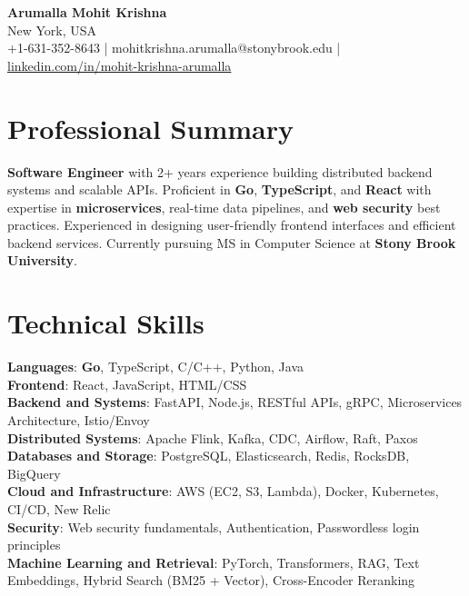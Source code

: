 \documentclass[letterpaper,11pt]{article}
\begin{document}
\begin{center}
  {\Large \textbf{Arumalla Mohit Krishna}} \\
  New York, USA \\
  +1-631-352-8643 \enspace | \enspace mohitkrishna.arumalla@stonybrook.edu \enspace | \enspace \href{https://www.linkedin.com/in/mohit-krishna-arumalla}{linkedin.com/in/mohit-krishna-arumalla}
\end{center}

\section{Professional Summary}
  \begin{itemize}[leftmargin=0.15in, label={}]
    \small{\item{
     \textbf{Software Engineer} with 2+ years experience building distributed backend systems and scalable APIs. Proficient in \textbf{Go}, \textbf{TypeScript}, and \textbf{React} with expertise in \textbf{microservices}, real-time data pipelines, and \textbf{web security} best practices. Experienced in designing user-friendly frontend interfaces and efficient backend services. Currently pursuing MS in Computer Science at \textbf{Stony Brook University}.
    }}
  \end{itemize}
\vspace{-16pt}

\section{Technical Skills}
 \begin{itemize}[leftmargin=0.15in, label={}]
    \small{\item{
     \textbf{Languages}: \textbf{Go}, TypeScript, C/C++, Python, Java \\
     \textbf{Frontend}: React, JavaScript, HTML/CSS \\
     \textbf{Backend and Systems}: FastAPI, Node.js, RESTful APIs, gRPC, Microservices Architecture, Istio/Envoy \\
     \textbf{Distributed Systems}: Apache Flink, Kafka, CDC, Airflow, Raft, Paxos \\
     \textbf{Databases and Storage}: PostgreSQL, Elasticsearch, Redis, RocksDB, BigQuery \\
     \textbf{Cloud and Infrastructure}: AWS (EC2, S3, Lambda), Docker, Kubernetes, CI/CD, New Relic \\
     \textbf{Security}: Web security fundamentals, Authentication, Passwordless login principles \\
     \textbf{Machine Learning and Retrieval}: PyTorch, Transformers, RAG, Text Embeddings, Hybrid Search (BM25 + Vector), Cross-Encoder Reranking
    }}
 \end{itemize}
\vspace{-16pt}
\end{document}

